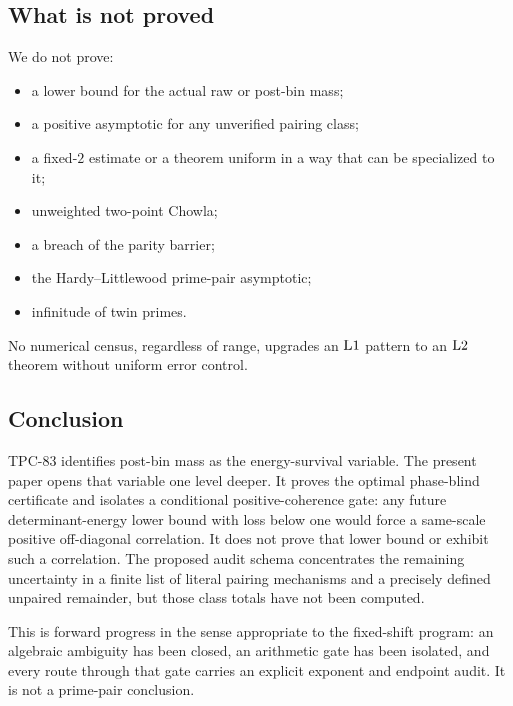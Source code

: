 \subsection{What is not proved}

We do not prove:
\begin{itemize}[leftmargin=2em]
 \item a lower bound for the actual raw or post-bin mass;
 \item a positive asymptotic for any unverified pairing class;
 \item a fixed-\(2\) estimate or a theorem uniform in a way that can
 be specialized to it;
 \item unweighted two-point Chowla;
 \item a breach of the parity barrier;
 \item the Hardy--Littlewood prime-pair asymptotic;
 \item infinitude of twin primes.
\end{itemize}
No numerical census, regardless of range, upgrades an \(\mathrm{L1}\)
pattern to an \(\mathrm{L2}\) theorem without uniform error control.

\subsection{Conclusion}

TPC-83 identifies post-bin mass as the energy-survival variable.
The present paper opens that variable one level deeper.  It proves the
optimal phase-blind certificate and isolates a conditional
positive-coherence gate: any future determinant-energy lower bound
with loss below one would force a same-scale positive off-diagonal
correlation.  It does not prove that lower bound or exhibit such a
correlation.  The proposed audit schema concentrates the remaining
uncertainty in a finite list of literal pairing mechanisms and a
precisely defined unpaired remainder, but those class totals have not
been computed.

This is forward progress in the sense appropriate to the fixed-shift
program: an algebraic ambiguity has been closed, an arithmetic gate
has been isolated, and every route through that gate carries an
explicit exponent and endpoint audit.  It is not a prime-pair
conclusion.
